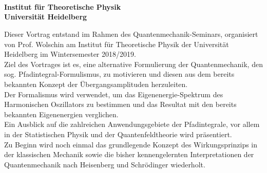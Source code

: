 \begin{center}

	\makeatletter
	\thispagestyle{plain}
	\LARGE\textbf{\@title} \\
	\vspace{2mm}
	\large\bfseries{\@author} \\
	\normalfont
	\vspace{2mm}
	\large{\@date} \\
	\vspace{2mm}
	\large{Institut für Theoretische Physik \\
		Universität Heidelberg} \\
	\makeatother
\end{center}

\normalsize

Dieser Vortrag entstand im Rahmen des Quantenmechanik-Seminars, organisiert von Prof. Wolschin am Institut für Theoretische Physik der Universität Heidelberg im Wintersemester 2018/2019. \\
Ziel des Vortrages ist es, eine alternative Formulierung der Quantenmechanik, den sog. Pfadintegral-Formulismus, zu motivieren und diesen aus dem bereits bekannten Konzept der Übergangsamplituden herzuleiten.  \\
Der Formalismus wird verwendet, um das Eigenenergie-Spektrum des Harmonischen Oszillators zu bestimmen und das Resultat mit den bereits bekannten Eigenenergien verglichen. \\
Ein Ausblick auf die zahlreichen Anwendungsgebiete der Pfadintegrale, vor allem in der Statistischen Physik und der Quantenfeldtheorie wird präsentiert. \\
Zu Beginn wird noch einmal das grundlegende Konzept des Wirkungsprinzips in der klassischen Mechanik sowie die bisher kennengelernten Interpretationen der Quantenmechanik nach Heisenberg und Schrödinger wiederholt.